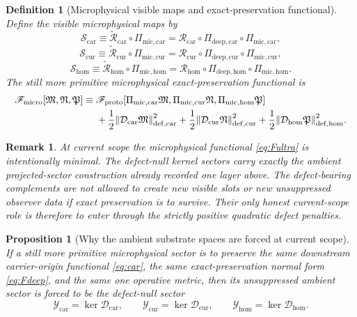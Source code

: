 \documentclass[11pt]{article}
\newcommand{\ProtoFunctional}{\mathscr F_{\mathrm{proto}}}
\newcommand{\CarRead}{\mathcal R_{\mathrm{car}}}
\newcommand{\CurRead}{\mathcal R_{\mathrm{cur}}}
\newcommand{\HomRead}{\mathcal R_{\mathrm{hom}}}
\newcommand{\ProtoTensorClass}{\mathscr Y_{\mathrm{car}}}
\newcommand{\ProtoRelabelClass}{\mathscr Y_{\mathrm{cur}}}
\newcommand{\ProtoFreeClass}{\mathscr Y_{\mathrm{hom}}}
\newcommand{\ProtoCarProj}{\Pi_{\mathrm{deep,car}}}
\newcommand{\ProtoCurProj}{\Pi_{\mathrm{deep,cur}}}
\newcommand{\ProtoHomProj}{\Pi_{\mathrm{deep,hom}}}
\newcommand{\ProtoCarRead}{\widetilde{\mathcal R}_{\mathrm{car}}}
\newcommand{\ProtoCurRead}{\widetilde{\mathcal R}_{\mathrm{cur}}}
\newcommand{\ProtoHomRead}{\widetilde{\mathcal R}_{\mathrm{hom}}}
\newcommand{\UltraFunctional}{\mathscr F_{\mathrm{micro}}}
\newcommand{\UltraTensor}{\mathfrak M}
\newcommand{\UltraRelabel}{\mathfrak N}
\newcommand{\UltraFree}{\mathfrak P}
\newcommand{\UltraCarProj}{\Pi_{\mathrm{mic,car}}}
\newcommand{\UltraCurProj}{\Pi_{\mathrm{mic,cur}}}
\newcommand{\UltraHomProj}{\Pi_{\mathrm{mic,hom}}}
\newcommand{\TensorDefect}{\mathcal D_{\mathrm{car}}}
\newcommand{\CurDefect}{\mathcal D_{\mathrm{cur}}}
\newcommand{\HomDefect}{\mathcal D_{\mathrm{hom}}}
\newcommand{\UltraCarRead}{\mathcal S_{\mathrm{car}}}
\newcommand{\UltraCurRead}{\mathcal S_{\mathrm{cur}}}
\newcommand{\UltraHomRead}{\mathcal S_{\mathrm{hom}}}
\newtheorem{definition}{Definition}
\newtheorem{proposition}{Proposition}
\newtheorem{remark}{Remark}
\begin{document}
\begin{definition}[Microphysical visible maps and exact-preservation functional]
\label{def:Fultra}
Define the visible microphysical maps by
\begin{equation}
\UltraCarRead\equiv \ProtoCarRead\circ\UltraCarProj
=
\CarRead\circ\ProtoCarProj\circ\UltraCarProj,
\label{eq:ultra_car_map}
\end{equation}
\begin{equation}
\UltraCurRead\equiv \ProtoCurRead\circ\UltraCurProj
=
\CurRead\circ\ProtoCurProj\circ\UltraCurProj,
\label{eq:ultra_cur_map}
\end{equation}
\begin{equation}
\UltraHomRead\equiv \ProtoHomRead\circ\UltraHomProj
=
\HomRead\circ\ProtoHomProj\circ\UltraHomProj.
\label{eq:ultra_hom_map}
\end{equation}
The still more primitive microphysical exact-preservation functional is
\begin{equation}
\begin{aligned}
\UltraFunctional[\UltraTensor,\UltraRelabel,\UltraFree]
\equiv\;
&\ProtoFunctional[
\UltraCarProj\UltraTensor,\UltraCurProj\UltraRelabel,\UltraHomProj\UltraFree]
\\
&+\frac12\norm{\TensorDefect\UltraTensor}_{\mathrm{def,car}}^2
+\frac12\norm{\CurDefect\UltraRelabel}_{\mathrm{def,cur}}^2
+\frac12\norm{\HomDefect\UltraFree}_{\mathrm{def,hom}}^2.
\end{aligned}
\label{eq:Fultra}
\end{equation}
\end{definition}

\begin{remark}
At current scope the microphysical functional \eqref{eq:Fultra} is intentionally minimal. The defect-null kernel sectors carry exactly the ambient projected-sector construction already recorded one layer above. The defect-bearing complements are not allowed to create new visible slots or new unsuppressed observer data if exact preservation is to survive. Their only honest current-scope role is therefore to enter through the strictly positive quadratic defect penalties.
\end{remark}

\begin{proposition}[Why the ambient substrate spaces are forced at current scope]
\label{prop:ambient_forced}
If a still more primitive microphysical sector is to preserve the same downstream carrier-origin functional \eqref{eq:car}, the same exact-preservation normal form \eqref{eq:Fdeep}, and the same one operative metric, then its unsuppressed ambient sector is forced to be the defect-null sector
\[
\ProtoTensorClass=\ker\TensorDefect,\qquad
\ProtoRelabelClass=\ker\CurDefect,\qquad
\ProtoFreeClass=\ker\HomDefect.
\]
\end{proposition}
\end{document}
